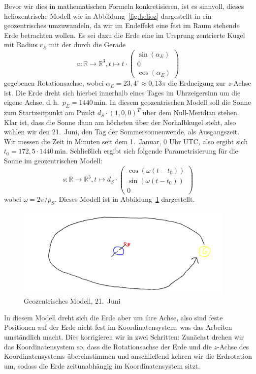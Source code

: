 \documentclass[
    paper=a4,
    DIV14,
    fontsize=12pt,
    pagesize=pdftex,
    toc=bibliographynumbered
]{scrartcl}
\numberwithin{figure}{section}
\numberwithin{equation}{section}
\numberwithin{table}{section}
\newcommand*\setR{\mathds{R}}
\newcommand*\vecd[3]{\begin{pmatrix} #1 \\ #2 \\ #3 \end{pmatrix}}
\begin{document}
Bevor wir dies in mathematischen Formeln konkretisieren, ist es sinnvoll, dieses
heliozentrische Modell wie in Abbildung~\ref{fig:helioz} dargestellt in ein geozentrisches
umzuwandeln, da wir im Endeffekt eine fest im Raum stehende Erde betrachten wollen. Es sei
dazu die Erde eine im Ursprung zentrierte Kugel mit Radius $r_E$ mit der durch die Gerade
\begin{equation*}
    a : \setR \to \setR^3, t \mapsto t\cdot \vecd{\sin(\alpha_E)}0{\cos(\alpha_E)}
\end{equation*}
gegebenen Rotationsachse, wobei $\alpha_E = 23{,}4^\circ \approx 0{,}13\pi$ die Erdneigung
zur $z$-Achse ist. Die Erde dreht sich hierbei innerhalb eines Tages im Uhrzeigersinn um
die eigene Achse, d.\,h.\ $p_E=1440\,\mathrm{min}$. In diesem geozentrischen Modell soll
die Sonne zum Startzeitpunkt am Punkt $d_S \cdot (1, 0, 0)^T$ über dem Null-Meridian
stehen. Klar ist, dass die Sonne dann am höchsten über der Norhalbkugel steht, also wählen
wir den 21.\ Juni, den Tag der Sommersonnenwende, als Ausgangszeit. Wir messen die Zeit in
Minuten seit dem 1.\ Januar, 0 Uhr UTC, also ergibt sich $t_0=172{,}5 \cdot 1440
\,\mathrm{min}$. Schließlich ergibt sich folgende Parametrisierung für die Sonne im
geozentrischen Modell:
\begin{equation*}
    s: \setR \to \setR^3, t\mapsto d_S \cdot
        \vecd{\cos( \omega(t - t_0) )}{\sin( \omega(t - t_0) )}0
\end{equation*}
wobei $\omega = 2\pi/p_S$. Dieses Modell ist in Abbildung~\ref{fig:geoz} dargestellt.

\begin{figure}[htb]
    \centering
    \includegraphics[width=0.95\textwidth]{images/tmp/geoz.png}
    \caption{Geozentrisches Modell, 21.\ Juni}
    \label{fig:geoz}
\end{figure}

In diesem Modell dreht sich die Erde aber um ihre Achse, also sind feste Positionen auf
der Erde nicht fest im Koordinatensystem, was das Arbeiten umständlich macht. Dies
korrigieren wir in zwei Schritten: Zunächst drehen wir das Koordinatensystem so, dass
die Rotationsachse der Erde und die $z$-Achse des Koordinatensystems übereinstimmen und
anschließend kehren wir die Erdrotation um, sodass die Erde zeitunabhängig im
Koordinatensystem sitzt.
\end{document}
